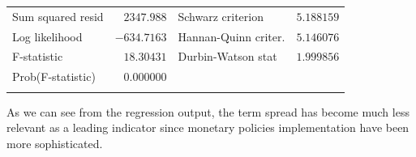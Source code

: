 \documentclass[12pt]{report}
\begin{document}
\begin{table}[H]
\begin{tabular}{lrrrr}
		\multicolumn{1}{l}{Sum squared resid}&\multicolumn{1}{r}{$2347.988$}&\multicolumn{2}{l}{Schwarz criterion}&\multicolumn{1}{r}{$5.188159$}\\
		\multicolumn{1}{l}{Log likelihood}&\multicolumn{1}{r}{$-634.7163$}&\multicolumn{2}{l}{Hannan-Quinn criter.}&\multicolumn{1}{r}{$5.146076$}\\
		\multicolumn{1}{l}{F-statistic}&\multicolumn{1}{r}{$18.30431$}&\multicolumn{2}{l}{Durbin-Watson stat}&\multicolumn{1}{r}{$1.999856$}\\
		\multicolumn{1}{l}{Prob(F-statistic)}&\multicolumn{1}{r}{$0.000000$}&\multicolumn{1}{c}{}&\multicolumn{1}{c}{}&\multicolumn{1}{c}{}\\
		[4.5pt] \hline \\ [-4.5pt]
	\end{tabular}
\end{table}
\vspace{-\baselineskip} \noindent As we can see from the regression output, the term spread has become much less relevant as a leading indicator since monetary policies implementation have been more sophisticated.
\end{document}
